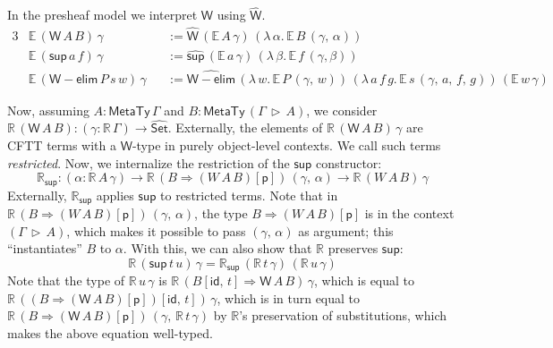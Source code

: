 \documentclass[acmsmall,screen]{acmart}
\newcommand{\mit}[1]{{\mathsf{#1}}}
\newcommand{\msf}[1]{{\mathsf{#1}}}
\newcommand{\mbb}[1]{\mathbb{#1}}
\newcommand{\p}{\mathsf{p}}
\newcommand{\wh}[1]{\widehat{#1}}
\newcommand{\whset}{\wh{\Set}}
\newcommand{\ev}{\mbb{E}}
\newcommand{\re}{\mbb{R}}
\newcommand{\vW}{\mathsf{W}}
\newcommand{\vsup}{\mathsf{sup}}
\newcommand{\whW}{\wh{\vW}}
\newcommand{\Set}{\msf{Set}}
\newcommand{\ext}{\triangleright}
\newcommand{\MTy}{\msf{MetaTy}}
\theoremstyle{remark}
\newcommand{\id}{\mit{id}}
\begin{document}
In the presheaf model we interpret $\vW$ using $\whW$.
\begin{alignat*}{3}
  & \ev\,(\vW\,A\,B)\,\gamma   &&:= \wh{\vW}\,(\ev\,A\,\gamma)\,(\lambda\,\alpha.\,\ev\,B\,(\gamma,\,\alpha))\\
  & \ev\,(\vsup\,a\,f)\,\gamma &&:= \wh{\vsup}\,(\ev\,a\,\gamma)\,(\lambda\,\beta.\,\ev\,f\,(\gamma, \beta))\\
  & \ev\,(\vW{-}\msf{elim}\,P\,s\,w)\,\gamma &&:= \wh{\vW{-}\msf{elim}}\,(\lambda\,w.\,\ev\,P\,(\gamma,\,w))\,(\lambda\,a\,f\,g.\,\ev\,s\,(\gamma,\,a,\,f,\,g))\,(\ev\,w\,\gamma)
\end{alignat*}

Now, assuming $A : \MTy\,\Gamma$ and $B : \MTy\,(\Gamma\,\ext\,A)$, we consider
$\re\,(\vW\,A\,B) : (\gamma : \re\,\Gamma) \to \whset$. Externally, the elements
of $\re\,(\vW\,A\,B)\,\gamma$ are CFTT terms with a $\vW$-type in purely
object-level contexts. We call such terms \emph{restricted}. Now, we internalize
the restriction of the $\vsup$ constructor:
\[ \re_{\vsup} : (\alpha : \re\,A\,\gamma) \to \re\,(B \Rightarrow (W\,A\,B)[\p])\,(\gamma,\,\alpha) \to \re\,(W\,A\,B)\,\gamma \]
Externally, $\re_{\vsup}$ applies $\vsup$ to restricted terms. Note that in
$\re\,(B \Rightarrow (W\,A\,B)[\p])\,(\gamma,\,\alpha)$, the type $B \Rightarrow (W\,A\,B)[\p]$ is in
the context $(\Gamma\,\ext\,A)$, which makes it possible to pass $(\gamma,\,\alpha)$ as
argument; this ``instantiates'' $B$ to $\alpha$. With this, we can also
show that $\re$ preserves $\vsup$:
\[ \re\,(\vsup\,t\,u)\,\gamma = \re_\vsup\,(\re\,t\,\gamma)\,(\re\,u\,\gamma) \]
Note that the type of $\re\,u\,\gamma$ is $\re\,(B[\id,\,t] \Rightarrow
\vW\,A\,B)\,\gamma$, which is equal to $\re\,((B \Rightarrow
(\vW\,A\,B)[\p])[\id,\,t])\,\gamma$, which is in turn equal to $\re\,(B
\Rightarrow (\vW\,A\,B)[\p])\,(\gamma,\,\re\,t\,\gamma)$ by $\re$'s preservation
of substitutions, which makes the above equation well-typed.
\end{document}
